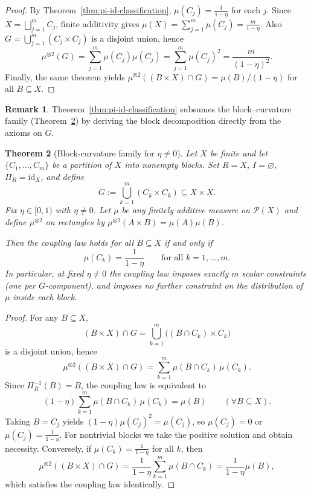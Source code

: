 \documentclass[11pt]{article}
\numberwithin{equation}{section}
\newtheorem{theorem}{Theorem}[section]
\theoremstyle{definition}
\newtheorem{remark}[theorem]{Remark}
\begin{document}
\begin{proof}
By Theorem~\ref{thm:pi-id-classification}, $\mu(C_j)=\frac{1}{1-\eta}$ for each $j$.
Since $X=\bigsqcup_{j=1}^m C_j$, finite additivity gives $\mu(X)=\sum_{j=1}^m \mu(C_j)=\frac{m}{1-\eta}$.
Also $G=\bigcup_{j=1}^m (C_j\times C_j)$ is a disjoint union, hence
\[
\mu^{\otimes2}(G)=\sum_{j=1}^m \mu(C_j)\mu(C_j)=\sum_{j=1}^m \mu(C_j)^2=\frac{m}{(1-\eta)^2}.
\]
Finally, the same theorem yields $\mu^{\otimes2}((B\times X)\cap G)=\mu(B)/(1-\eta)$ for all $B\subseteq X$.
\end{proof}

\begin{remark}
Theorem~\ref{thm:pi-id-classification} subsumes the block--curvature family (Theorem~\ref{thm:block-curvature-family}) by deriving the block decomposition directly from the axioms on $G$.
\end{remark}

\begin{theorem}[Block-curvature family for $\eta\neq 0$]\label{thm:block-curvature-family}
Let $X$ be finite and let $\{C_1,\dots,C_m\}$ be a partition of $X$ into nonempty blocks.
Set $R=X$, $I=\varnothing$, $\Pi_R=\mathrm{id}_X$, and define
\[
G:=\bigcup_{k=1}^m (C_k\times C_k)\subseteq X\times X.
\]
Fix $\eta\in[0,1)$ with $\eta\neq 0$. Let $\mu$ be any finitely additive measure on $\mathcal P(X)$ and define $\mu^{\otimes 2}$ on rectangles by
$\mu^{\otimes 2}(A\times B)=\mu(A)\mu(B)$.

Then the coupling law holds for all $B\subseteq X$ if and only if
\[
\mu(C_k)=\frac{1}{1-\eta}\qquad \text{for all }k=1,\dots,m.
\]
In particular, at fixed $\eta\neq 0$ the coupling law imposes exactly $m$ scalar constraints (one per $G$-component), and imposes no further constraint on the distribution of $\mu$ inside each block.
\end{theorem}

\begin{proof}
For any $B\subseteq X$,
\[
(B\times X)\cap G=\bigcup_{k=1}^m \big((B\cap C_k)\times C_k\big)
\]
is a disjoint union, hence
\[
\mu^{\otimes 2}((B\times X)\cap G)=\sum_{k=1}^m \mu(B\cap C_k)\,\mu(C_k).
\]
Since $\Pi_R^{-1}(B)=B$, the coupling law is equivalent to
\[
(1-\eta)\sum_{k=1}^m \mu(B\cap C_k)\,\mu(C_k)=\mu(B)\qquad(\forall B\subseteq X).
\]
Taking $B=C_j$ yields $(1-\eta)\mu(C_j)^2=\mu(C_j)$, so $\mu(C_j)=0$ or $\mu(C_j)=\frac{1}{1-\eta}$.
For nontrivial blocks we take the positive solution and obtain necessity.
Conversely, if $\mu(C_k)=\frac{1}{1-\eta}$ for all $k$, then
\[
\mu^{\otimes 2}((B\times X)\cap G)=\frac{1}{1-\eta}\sum_{k=1}^m \mu(B\cap C_k)=\frac{1}{1-\eta}\mu(B),
\]
which satisfies the coupling law identically.
\end{proof}
\end{document}
